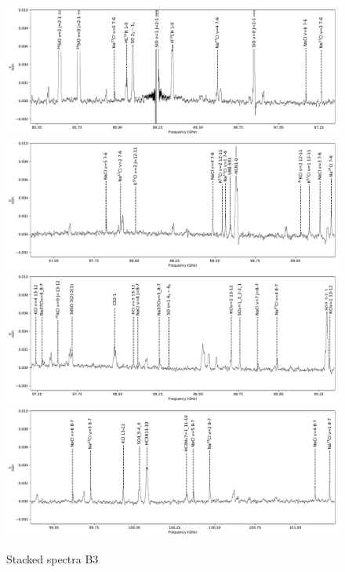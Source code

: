 \documentclass[12pt]{article}
\begin{document}
\begin{figure}[!htp]
\includegraphics[scale=1,width=5.5in]{figures/lines_labeled_OrionSourceI_B3_spw0_robust0.5.pdf}
\includegraphics[scale=1,width=5.5in]{figures/lines_labeled_OrionSourceI_B3_spw1_robust0.5.pdf}
\includegraphics[scale=1,width=5.5in]{figures/lines_labeled_OrionSourceI_B3_spw2_robust0.5.pdf}
\includegraphics[scale=1,width=5.5in]{figures/lines_labeled_OrionSourceI_B3_spw3_robust0.5.pdf}
\caption{Stacked spectra  B3}
\label{fig:spectrab3}
\end{figure}
\end{document}
